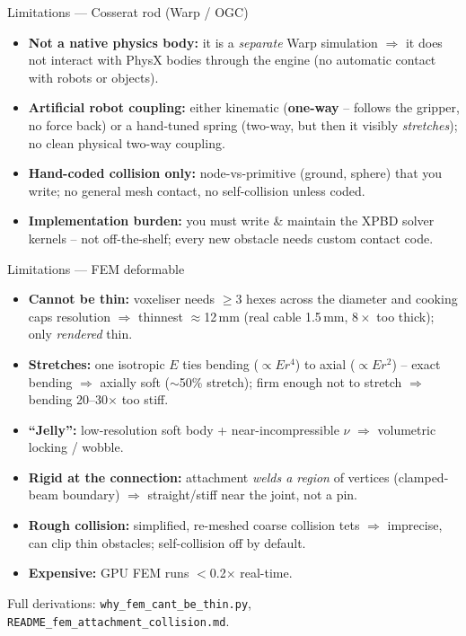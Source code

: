 \documentclass[aspectratio=169]{beamer}
\begin{document}
\begin{frame}{Limitations --- Cosserat rod (Warp / OGC)}
  \footnotesize
  \begin{itemize}\itemsep2pt
    \item \textbf{Not a native physics body:} it is a \emph{separate} Warp simulation
          $\Rightarrow$ it does not interact with PhysX bodies through the engine
          (no automatic contact with robots or objects).
    \item \textbf{Artificial robot coupling:} either kinematic (\textbf{one-way} --
          follows the gripper, no force back) or a hand-tuned spring (two-way, but then
          it visibly \emph{stretches}); no clean physical two-way coupling.
    \item \textbf{Hand-coded collision only:} node-vs-primitive (ground, sphere) that
          you write; no general mesh contact, no self-collision unless coded.
    \item \textbf{Implementation burden:} you must write \& maintain the XPBD solver
          kernels -- not off-the-shelf; every new obstacle needs custom contact code.
  \end{itemize}
\end{frame}

\begin{frame}{Limitations --- FEM deformable}
  \footnotesize
  \begin{itemize}\itemsep1pt
    \item \textbf{Cannot be thin:} voxeliser needs $\geq$3 hexes across the diameter and
          cooking caps resolution $\Rightarrow$ thinnest $\approx$12\,mm (real cable
          1.5\,mm, $8\times$ too thick); only \emph{rendered} thin.
    \item \textbf{Stretches:} one isotropic $E$ ties bending ($\propto E r^4$) to axial
          ($\propto E r^2$) -- exact bending $\Rightarrow$ axially soft ($\sim$50\%
          stretch); firm enough not to stretch $\Rightarrow$ bending 20--30$\times$ too stiff.
    \item \textbf{``Jelly'':} low-resolution soft body + near-incompressible $\nu$
          $\Rightarrow$ volumetric locking / wobble.
    \item \textbf{Rigid at the connection:} attachment \emph{welds a region} of vertices
          (clamped-beam boundary) $\Rightarrow$ straight/stiff near the joint, not a pin.
    \item \textbf{Rough collision:} simplified, re-meshed coarse collision tets
          $\Rightarrow$ imprecise, can clip thin obstacles; self-collision off by default.
    \item \textbf{Expensive:} GPU FEM runs $<$0.2$\times$ real-time.
  \end{itemize}
  {\scriptsize Full derivations: \texttt{why\_fem\_cant\_be\_thin.py},
   \texttt{README\_fem\_attachment\_collision.md}.}
\end{frame}
\end{document}
